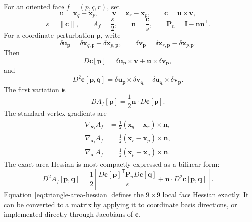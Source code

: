 \documentclass[11pt]{article}
\newcommand{\T}{\mathsf{T}}
\newcommand{\grad}{\nabla}
\newcommand{\Id}{\mathbf{I}}
\newcommand{\Pmat}{\mathbf{P}}
\begin{document}
For an oriented face $f=(p,q,r)$, set
\begin{equation}
  \mathbf{u}=\mathbf{x}_q-\mathbf{x}_p,
  \qquad
  \mathbf{v}=\mathbf{x}_r-\mathbf{x}_p,
  \qquad
  \mathbf{c}=\mathbf{u}\times\mathbf{v},
\end{equation}
\begin{equation}
  s=\|\mathbf{c}\|,
  \qquad
  A_f=\frac{s}{2},
  \qquad
  \mathbf{n}=\frac{\mathbf{c}}{s},
  \qquad
  \Pmat_n=\Id-\mathbf{n}\mathbf{n}^\T.
\end{equation}
For a coordinate perturbation $\mathbf{p}$, write
\begin{equation}
  \delta\mathbf{u}_{\mathbf{p}}
  =\delta\mathbf{x}_{q,\mathbf{p}}-\delta\mathbf{x}_{p,\mathbf{p}},
  \qquad
  \delta\mathbf{v}_{\mathbf{p}}
  =\delta\mathbf{x}_{r,\mathbf{p}}-\delta\mathbf{x}_{p,\mathbf{p}}.
\end{equation}
Then
\begin{equation}
  D\mathbf{c}[\mathbf{p}]
  =\delta\mathbf{u}_{\mathbf{p}}\times\mathbf{v}
   +\mathbf{u}\times\delta\mathbf{v}_{\mathbf{p}},
  \label{eq:cross-first}
\end{equation}
and
\begin{equation}
  D^2\mathbf{c}[\mathbf{p},\mathbf{q}]
  =\delta\mathbf{u}_{\mathbf{p}}\times\delta\mathbf{v}_{\mathbf{q}}
   +\delta\mathbf{u}_{\mathbf{q}}\times\delta\mathbf{v}_{\mathbf{p}}.
  \label{eq:cross-second}
\end{equation}
The first variation is
\begin{equation}
  DA_f[\mathbf{p}]
  =\frac{1}{2}\mathbf{n}\cdot D\mathbf{c}[\mathbf{p}].
\end{equation}
The standard vertex gradients are
\begin{align}
  \grad_{\mathbf{x}_p}A_f
  &=\frac{1}{2}(\mathbf{x}_q-\mathbf{x}_r)\times\mathbf{n},\\
  \grad_{\mathbf{x}_q}A_f
  &=\frac{1}{2}(\mathbf{x}_r-\mathbf{x}_p)\times\mathbf{n},\\
  \grad_{\mathbf{x}_r}A_f
  &=\frac{1}{2}(\mathbf{x}_p-\mathbf{x}_q)\times\mathbf{n}.
\end{align}
The exact area Hessian is most compactly expressed as a bilinear form:
\begin{equation}
  \boxed{
  D^2A_f[\mathbf{p},\mathbf{q}]
  =\frac{1}{2}\left[
    \frac{D\mathbf{c}[\mathbf{p}]^\T\Pmat_nD\mathbf{c}[\mathbf{q}]}{s}
    +\mathbf{n}\cdot D^2\mathbf{c}[\mathbf{p},\mathbf{q}]
  \right].}
  \label{eq:triangle-area-hessian}
\end{equation}
Equation~\eqref{eq:triangle-area-hessian} defines the $9\times9$ local face Hessian exactly.  It can be converted to a matrix by applying it to coordinate basis directions, or implemented directly through Jacobians of $\mathbf{c}$.
\end{document}
